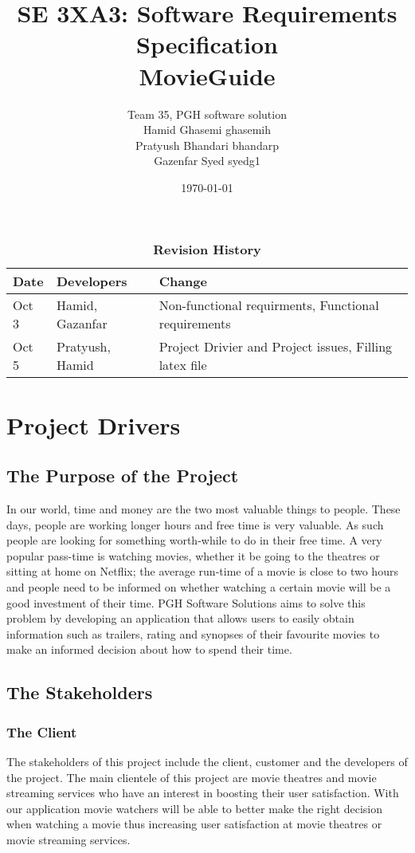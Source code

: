 \documentclass[12pt, titlepage]{article}
\title{SE 3XA3: Software Requirements Specification\\ MovieGuide}
\author{Team 35, PGH software solution
		\\ Hamid Ghasemi  ghasemih
		\\ Pratyush Bhandari  bhandarp
		\\ Gazenfar Syed	syedg1
}
\date{\today}
\begin{document}
\maketitle

\tableofcontents
\newpage
\listoftables
\listoffigures


\begin{table}[bp]
\caption{\bf Revision History}
\begin{tabularx}{\textwidth}{p{3cm}p{2cm}X}
\toprule {\bf Date} & {\bf Developers} &  {\bf Change}\\
\midrule
 Oct 3 & Hamid, Gazanfar & Non-functional requirments, Functional requirements\\
 Oct 5 & Pratyush, Hamid & Project Drivier and Project issues, Filling latex file\\
\bottomrule
\end{tabularx}
\end{table}


\newpage
{}



\section{Project Drivers}
\subsection{The Purpose of the Project}
In our world, time and money are the two most valuable things to people. These days, people are working longer hours and free time is very valuable. As such people are looking for something worth-while to do in their free time. A very popular pass-time is watching movies, whether it be going to the theatres or sitting at home on Netflix; the average run-time of a movie is close to two hours and people need to be informed on whether watching a certain movie will be a good investment of their time. PGH Software Solutions aims to solve this problem by developing an application that allows users to easily obtain information such as trailers, rating and synopses of their favourite movies to make an informed decision about how to spend their time.

\subsection{The Stakeholders}

\subsubsection{The Client}
The stakeholders of this project include the client, customer and the developers of the project. The main clientele of this project are movie theatres and movie streaming services who have an interest in boosting their user satisfaction. With our application movie watchers will be able to better make the right decision when watching a movie thus increasing user satisfaction at movie theatres or movie streaming services.
\end{document}
